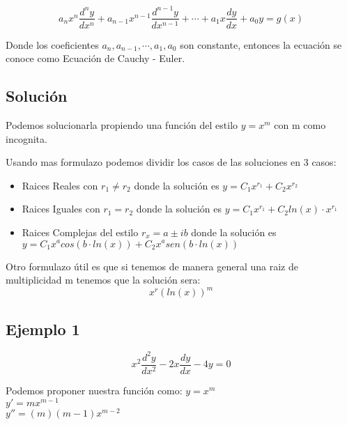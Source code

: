 \documentclass[12pt]{report}                               %
\begin{document}
        \begin{equation}
            a_n x^n \frac{d^n y}{dx^n} + a_{n-1} x^{n-1} \frac{d^{n-1} y}{dx^{n-1}} + \cdots + a_1 x \frac{dy}{dx} + a_0 y = g(x)
        \end{equation}

        Donde los coeficientes $a_n, a_{n-1}, \cdots , a_1, a_0$ son constante, entonces la ecuación se conoce como Ecuación de Cauchy - Euler.

        \subsection{Solución}
        Podemos solucionarla propiendo una función del estilo $y = x^m$ con m como incognita.

        Usando mas formulazo podemos dividir los casos de las soluciones en 3 casos:

        \begin{itemize}
            \item Raices Reales con $r_1 \neq r_2$ donde la solución es $ y = C_1 x ^{r_1} + C_2 x^{r_2}$ 
            \item Raices Iguales con $r_1 = r_2$ donde la solución es $ y = C_1 x ^{r_1} + C_2 ln(x) \cdot x^{r_1}$ 
            \item Raices Complejas del estilo $r_x  = a \pm ib$ donde la solución es \\
            $ y = C_1 x^a cos(b \cdot ln(x)) + C_2 x^a sen(b \cdot ln(x))$ 
        \end{itemize}


        Otro formulazo útil es que si tenemos de manera general una raiz de multiplicidad m tenemos que la solución sera:
        \begin{equation}
            x^r (ln(x))^m
        \end{equation}


        \subsection{Ejemplo 1}
        \begin{equation*}
            x^2 \frac{d^2 y}{dx^2} - 2x \frac{dy}{dx} - 4y = 0
        \end{equation*}

        Podemos proponer nuestra función como:
        $y = x^m$\\
        $y' = mx^{m-1}$\\
        $y'' = (m)(m-1)x^{m-2}$\\
\end{document}
